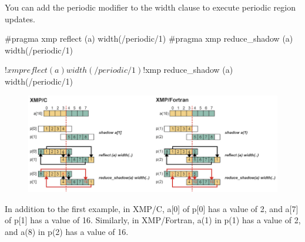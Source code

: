 You can add the periodic modifier to the width clause to execute
periodic region updates.

\begin{XCexample}
#pragma xmp reflect (a) width(/periodic/1)
#pragma xmp reduce_shadow (a) width(/periodic/1)
\end{XCexample}

\begin{XFexample}
!$xmp reflect (a) width(/periodic/1)
!$xmp reduce_shadow (a) width(/periodic/1)
\end{XFexample}

\begin{figure}
  \centering
  \includegraphics{figs/reduce_shadow_periodic.png}
\end{figure}

In addition to the first example, in XMP/C, a[0] of p[0] has a value of
2, and a[7] of p[1] has a value of 16. Similarly, in XMP/Fortran, a(1)
in p(1) has a value of 2, and a(8) in p(2) has a value of 16.